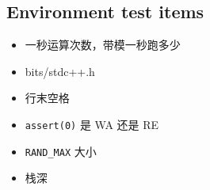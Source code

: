 \subsection{Environment test items}

\begin{itemize}
    \item 一秒运算次数，带模一秒跑多少
    \item bits/stdc++.h
    \item 行末空格
    \item \verb|assert(0)| 是 WA 还是 RE
    \item \verb|RAND_MAX| 大小
    \item 栈深
\end{itemize}

